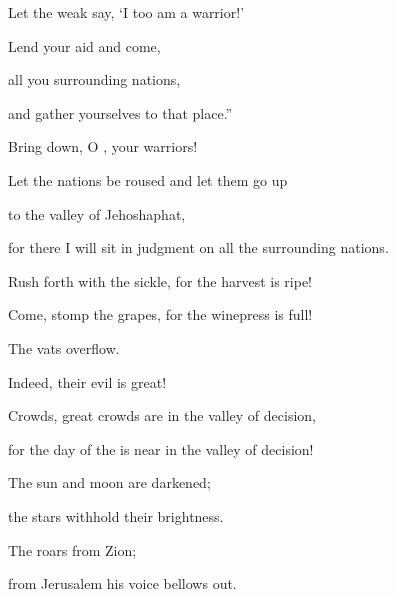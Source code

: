 {\par }{\Q Let the weak
say,
‘I too am
a warrior!’
\par }{\Q {}Lend your aid
and come,
\par }{\Q all
you surrounding
nations,
\par }{\Q and gather
yourselves to that place.”
\par }{\Q Bring down,
O
{}, your warriors!
\par }{\Q {}Let the nations
be roused
and let them go up
\par }{\Q to
the valley
of Jehoshaphat,
\par }{\Q for
there
I will sit
in judgment
on all
the surrounding
nations.
\par }{\Q {}Rush forth
with the sickle,
for
the harvest
is ripe!
\par }{\Q Come,
stomp
the grapes, for
the winepress
is full!
\par }{\Q The vats
overflow.
\par }{\Q Indeed,
their evil
is great!
\par }{\Q {}Crowds,
great crowds
are in the valley
of decision,
\par }{\Q for
the day
of the {}
is near
in the valley
of decision!
\par }{\Q {}The sun
and moon
are darkened;
\par }{\Q the stars
withhold
their brightness.
\par }{\Q {}The
{}
roars
from Zion;
\par }{\Q from Jerusalem
his voice
bellows
out.

}
